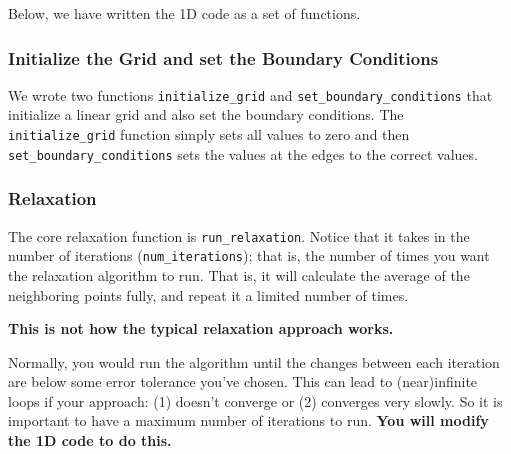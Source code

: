 Below, we have written the 1D code as a set of functions.

\subsubsection{Initialize the Grid and set the Boundary
Conditions}\label{initialize-the-grid-and-set-the-boundary-conditions}

We wrote two functions \texttt{initialize\_grid} and
\texttt{set\_boundary\_conditions} that initialize a linear grid and
also set the boundary conditions. The \texttt{initialize\_grid} function
simply sets all values to zero and then
\texttt{set\_boundary\_conditions} sets the values at the edges to the
correct values.

\begin{Shaded}
\begin{Highlighting}[]
    

\NormalTok{    grid[}\NormalTok{] }\OperatorTok{=}
\NormalTok{    grid[}\OperatorTok{{-}}\NormalTok{] }\OperatorTok{=}
    
\end{Highlighting}
\end{Shaded}

\subsubsection{Relaxation}\label{relaxation}

The core relaxation function is \texttt{run\_relaxation}. Notice that it
takes in the number of iterations (\texttt{num\_iterations}); that is,
the number of times you want the relaxation algorithm to run. That is,
it will calculate the average of the neighboring points fully, and
repeat it a limited number of times.

\textbf{This is not how the typical relaxation approach works.}

Normally, you would run the algorithm until the changes between each
iteration are below some error tolerance you've chosen. This can lead to
(near)infinite loops if your approach: (1) doesn't converge or (2)
converges very slowly. So it is important to have a maximum number of
iterations to run. \textbf{You will modify the 1D code to do this.}

